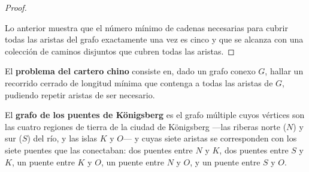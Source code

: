 \begin{proof}
\begin{center}
    \end{center}

    Lo anterior muestra que el número mínimo de cadenas necesarias para cubrir todas las aristas del grafo exactamente una vez es cinco y que se alcanza con una colección de caminos disjuntos que cubren todas las aristas.
\end{proof}

\vspace{0.5cm}

\begin{definition}
    El \textbf{problema del cartero chino} consiste en, dado un grafo conexo \( G \), hallar un recorrido cerrado de longitud mínima que contenga a todas las aristas de \( G \), pudiendo repetir aristas de ser necesario.
\end{definition}

\begin{definition}
    El \textbf{grafo de los puentes de Königsberg} es el grafo múltiple cuyos vértices son las cuatro regiones de tierra de la ciudad de Königsberg —las riberas norte (\( N \)) y sur (\( S \)) del río, y las islas \( K \) y \( O \)— y cuyas siete aristas se corresponden con los siete puentes que las conectaban: dos puentes entre \( N \) y \( K \), dos puentes entre \( S \) y \( K \), un puente entre \( K \) y \( O \), un puente entre \( N \) y \( O \), y un puente entre \( S \) y \( O \).
\end{definition}

